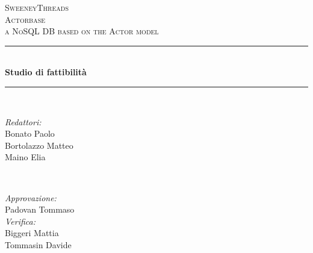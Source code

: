 \documentclass[a4paper]{article}
\begin{document}
	
	\begin{titlepage}
		\newcommand{\HRule}{\rule{\linewidth}{0.5mm}} 
		\center  
		
		\textsc{\LARGE SweeneyThreads}\\[1.5cm] 
		\textsc{\Large Actorbase}\\[0.5cm] 
		\textsc{\large a NoSQL DB based on the Actor model}\\[0.5cm]
		
		
		\HRule \\[0.4cm]
		{ \huge \bfseries Studio di fattibilità}\\[0.4cm] 
		\HRule \\[1.5cm]
		
		\begin{minipage}{0.4\textwidth}
			\begin{flushleft} \large
				\emph{Redattori:}\\
				Bonato Paolo \\
				Bortolazzo Matteo \\
				Maino Elia \\
			\end{flushleft}
		\end{minipage}
		~
		\begin{minipage}{0.4\textwidth}
			\begin{flushright} \large
				\emph{Approvazione:} \\
				Padovan Tommaso \\
				\emph{Verifica:} \\
				Biggeri Mattia \\
				Tommasin Davide \\
			\end{flushright}
		\end{minipage}
		

\end{titlepage}
\end{document}
